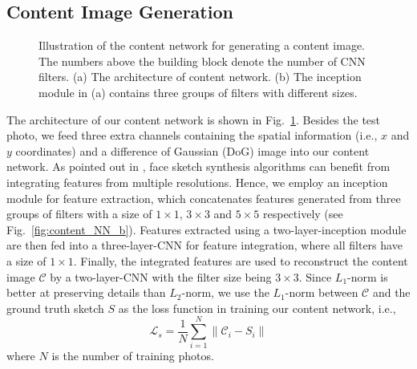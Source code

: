 \documentclass[10pt,twocolumn,letterpaper]{article}
\begin{document}
\subsection{Content Image Generation} \label{sec:content_net}
\begin{figure}[htbp]
\centering
{}
\caption{Illustration of the content network for generating a content image. The numbers above the building block denote the number of CNN filters. (a) The architecture of content network. (b) The inception module in (a) contains three groups of filters with different sizes.}
\label{fig:content_NN}
\end{figure}

The architecture of our content network is shown in Fig.~\ref{fig:content_NN}. Besides the test photo, we feed three extra channels containing the spatial information (i.e., $x$ and $y$ coordinates) and a difference of Gaussian (DoG) image into our content network. As pointed out in \cite{wang2009face}, face sketch synthesis algorithms can benefit from integrating features from multiple resolutions. Hence, we employ an inception module %
\cite{szegedy2015going} for feature extraction, which concatenates features generated from three groups of filters %
with a size of $1\times1$, $3\times3$ and $5\times5$ respectively (see Fig.~\ref{fig:content_NN_b}). Features extracted using a two-layer-inception module are then fed into a three-layer-CNN for feature integration, where all filters have a size of $1\times1$. Finally, the integrated features are used to reconstruct the content image $\mathcal{C}$  by a two-layer-CNN with the filter size being $3\times3$. Since $L_1$-norm is better at preserving details than $L_2$-norm, we use the $L_1$-norm between $\mathcal{C}$ and the ground truth sketch $S$ as the loss function in training our content network, i.e.,
\begin{equation}
\mathcal{L}_s = \frac{1}{N} \sum \limits_{i=1}^N \|\mathcal{C}_i - S_i\| \label{eq:content-net-loss}
\end{equation}
where $N$ is the number of training photos. 
\end{document}
